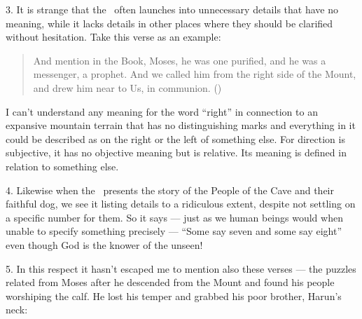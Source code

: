 \documentclass[12pt]{memoir}
\begin{document}
3. It is strange that the \Quran\ often launches
into unnecessary details that have no meaning,
while it lacks details in other places
where they should be clarified without hesitation.
Take this verse as an example:

\begin{quote}
And mention in the Book, Moses, he was one purified,
and he was a messenger, a prophet.
And we called him from the right side of the Mount,
and drew him near to Us, in communion.
()
\end{quote}

I can’t understand any meaning for the word “right” in connection
to an expansive mountain terrain that has no distinguishing marks
and everything in it could be described as on the right or the left
of something else.
For direction is subjective,
it has no objective meaning but is relative.
Its meaning is defined in relation to something else.

4. Likewise when the \Quran\ presents the story
of the People of the Cave and their faithful dog,
we see it listing details to a ridiculous extent,
despite not settling on a specific number for them.
So it says — just as we human beings would when unable
to specify something precisely —
“Some say seven and some say eight”
even though God is the knower of the unseen!

5. In this respect it hasn’t escaped me to mention also these verses —
the puzzles related from Moses after he descended
from the Mount and found his people worshiping the calf.
He lost his temper and grabbed his poor brother, Harun’s neck:
\end{document}
